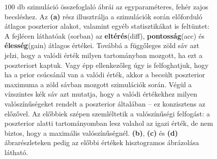 \begin{figure}[h!]
	\caption[Egy kompartmentum, egy paraméter, fehér zaj eredmény és ábratípus magyarázat]{$100$ db szimuláció összefoglaló ábrái az egyparaméteres, fehér zajos becsléshez. Az \textbf{(a)} rész illusztrálja a szimulációk során előforduló átlagos poszterior alakot, valamint egyéb statisztikákat is feltüntet: A fejlécen láthatóak (sorban) az \textbf{eltérés}(diff), \textbf{pontosság}(acc) és \textbf{élesség}(gain) átlagos értékei. Továbbá a függőleges zöld sáv azt jelzi, hogy a valódi érték milyen tartományban mozgott, ha ezt a poszteriort kaptuk. Vagy épp ellenkezőleg úgy is felfoghatjuk, hogy ha a prior csúcsánál van a valódi érték, akkor a becsült poszterior maximuma a zöld sávban mozgott szimulációk során. Végül a vízszintes kék sáv azt mutatja, hogy a valódi értékekhez milyen valószínűségeket rendelt a poszterior általában -- ez konzisztens az előzővel. Az előbbiek szépen szemléltetik a valószínűségi felfogást: a poszterior alatti tartományomban lesz valahol az igazi érték, de nem biztos, hogy a maximális valószínűségnél. \textbf{(b)}, \textbf{(c)} és \textbf{(d)} ábrarészleteken pedig az előbbi értékek hisztogramos ábrázolása látható.}
	\label{fig:wn1}
\end{figure}



